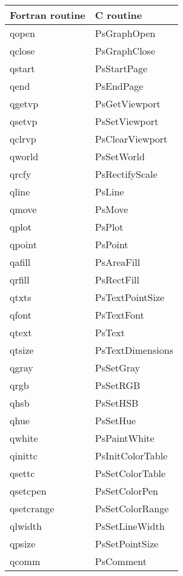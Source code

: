 \documentclass{article}
\begin{document}
\begin{table}
\begin{center}
\begin{tabular}{|l|l|} \hline

Fortran routine & C routine \\ \hline \hline

qopen   & PsGraphOpen           \\ \hline
qclose  & PsGraphClose          \\ \hline
qstart  & PsStartPage           \\ \hline
qend    & PsEndPage             \\ \hline
                                   \hline
qgetvp  & PsGetViewport         \\ \hline
qsetvp  & PsSetViewport         \\ \hline
qclrvp  & PsClearViewport       \\ \hline
qworld  & PsSetWorld            \\ \hline
qrcfy   & PsRectifyScale        \\ \hline
                                   \hline
qline   & PsLine                \\ \hline
qmove   & PsMove                \\ \hline
qplot   & PsPlot                \\ \hline
qpoint  & PsPoint               \\ \hline
                                   \hline
qafill  & PsAreaFill            \\ \hline
qrfill  & PsRectFill            \\ \hline
                                   \hline
qtxts   & PsTextPointSize       \\ \hline
qfont   & PsTextFont            \\ \hline
qtext   & PsText                \\ \hline
qtsize  & PsTextDimensions      \\ \hline
                                   \hline
qgray   & PsSetGray             \\ \hline
qrgb    & PsSetRGB              \\ \hline
qhsb    & PsSetHSB              \\ \hline
qhue    & PsSetHue              \\ \hline
qwhite  & PsPaintWhite          \\ \hline
                                   \hline
qinittc    & PsInitColorTable   \\ \hline
qsettc     & PsSetColorTable    \\ \hline
qsetcpen   & PsSetColorPen      \\ \hline
qsetcrange & PsSetColorRange    \\ \hline
                                   \hline
qlwidth & PsSetLineWidth        \\ \hline
qpsize  & PsSetPointSize        \\ \hline
                                   \hline
qcomm   & PsComment             \\ \hline


\end{tabular}
\end{center}
\end{table}
\end{document}
